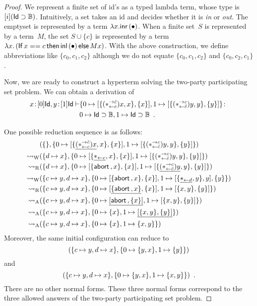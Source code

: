 \begin{proof}
We represent a finite set of id's as a
typed lambda term, whose type is $[i](\mathsf{Id}\supset \mathbb{B})$.  Intuitively, a
set takes an id and decides whether it is \textit{in} or \textit{out}.
The emptyset is represented by a term $\lambda x. \mathsf{inr}\left({\bullet}\right)$.
When a finite set~$S$ is represented by a term~$M$,
the set $S \cup \{c\}$ is represented by a term
$\lambda x.\left(\mathsf{If}\, {x==c}\, \mathsf{then}\, {\mathsf{inl}\left({\bullet}\right)}\, \mathsf{else}\, {Mx}\right)$.
With the above construction, we define abbreviations
like $\{c_0, c_1, c_2\}$ although we do not equate $\{c_0, c_1, c_2\}$
 and $\{c_0, c_2, c_1\}$.

Now, we are ready to construct a hyperterm solving the two-party
participating set problem.
We can obtain a derivation of
 \begin{align*}
{x} \mathord{\colon\kern -2pt}{[0]\mathsf{Id}}, {y} \mathord{\colon\kern -2pt}{[1]\mathsf{Id}}\vdash &
{\{0\mapsto[{\{(\ast^{\rightarrow {\bar{c}}}_{\leftarrow{c}})x,x\},\{x\}}],
1\mapsto[{\{(\ast^{\rightarrow {c}}_{\leftarrow{\bar{c}}})y,y\},\{y\}}]\}}\colon\\
&{0\mapsto \mathsf{Id}\supset \mathbb{B}, 1\mapsto \mathsf{Id}\supset \mathbb{B}}\enspace.
 \end{align*}

One possible reduction sequence is as follows:
\begin{align*}
 &
 ({\{\}},{\{0\mapsto[{\{\underline{(\ast^{\rightarrow {\bar{c}}}_{\leftarrow{c}})x},x\},\{x\}}],
 1\mapsto [{\{(\ast^{\rightarrow {c}}_{\leftarrow{\bar{c}}})y,y\},\{y\}}]\}})\\
 \rightsquigarrow_{\mathrm W}
 &({\{d\mapsto x\}},{\{0\mapsto[{\{\underline{\ast_{\leftarrow{c}}},x\},\{x\}}],
 1\mapsto[{\{(\ast^{\rightarrow {c}}_{\leftarrow{\bar{c}}})y,y\},\{y\}}]\}})
 \\
 \rightsquigarrow_{\mathrm R}
 &
 ({\{d\mapsto x\}},{\{0\mapsto [{\{\mathsf{abort\,},x\},
 \{x\}}],1\mapsto[{\{\underline{(\ast^{\rightarrow {c}}_{\leftarrow{\bar{c}}})y},y\},\{y\}}]\}})
 \\
 \rightsquigarrow_{\mathrm W}
 &
 ({\{c\mapsto y, d\mapsto x\}},{\{0\mapsto [{\{\mathsf{abort\,},x\},\{x\}}], 1\mapsto
 [{\{\underline{\ast_{\leftarrow{d}}},y\},y}],\{y\}\}}) \\
 \rightsquigarrow_{\mathrm R}
 &
 ({\{c\mapsto y, d\mapsto x\}},{\{0\mapsto [{\underline{\{\mathsf{abort\,}, x\}},\{x\}}],
 1\mapsto[{\{x,y\},\{y\}}]\}})
 \\
 \rightsquigarrow_{\mathrm A}
 &
 ({\{c\mapsto y,d\mapsto
 x\}},{\{0\mapsto\underline{[{\mathsf{abort\,},\{x\}}]}, 1\mapsto[{\{x,y\},\{y\}}]\}})
 \\
 \rightsquigarrow_{\mathrm A}
 &
 ({\{c\mapsto y,d\mapsto
 x\}},{\{0\mapsto\{x\}, 1\mapsto\underline{[{\{x,y\},\{y\}}]}\}})
 \\
 \rightsquigarrow_{\mathrm A}
 &
 ({\{c\mapsto y,d\mapsto
 x\}},{\{0\mapsto\{x\}, 1\mapsto\{x,y\}\}})
\end{align*}
Moreover, the same initial configuration can reduce to
\[
({\{c\mapsto y,d\mapsto
 x\}},{\{0\mapsto\{y,x\}, 1\mapsto\{y\}\}})\] and
\[
({\{c\mapsto y,d\mapsto
 x\}},{\{0\mapsto\{y,x\}, 1\mapsto\{x,y\}\}})\enspace.
\]
There are no other normal forms.
These three normal forms correspond to the three allowed answers of the
two-party participating set problem.
\end{proof}


